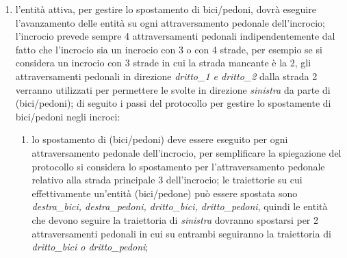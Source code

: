 \begin{enumerate}
\item l'entità attiva, per gestire lo spostamento di bici/pedoni, dovrà eseguire l'avanzamento delle entità su ogni attraversamento pedonale dell'incrocio; l'incrocio prevede sempre 4 attraversamenti pedonali indipendentemente dal fatto che l'incrocio sia un incrocio con 3 o con 4 strade, per esempio se si considera un incrocio con 3 strade in cui la strada mancante è la 2, gli attraversamenti pedonali in direzione \textit{dritto\_1 e dritto\_2} dalla strada 2 verranno utilizzati per permettere le svolte in direzione \textit{sinistra} da parte di (bici/pedoni); di seguito i passi del protocollo per gestire lo spostamente di bici/pedoni negli incroci:
\begin{enumerate}
\item lo spostamento di (bici/pedoni) deve essere eseguito per ogni attraversamento pedonale dell'incrocio, per semplificare la spiegazione del protocollo si considera lo spostamento per l'attraversamento pedonale relativo alla strada principale 3 dell'incrocio; le traiettorie su cui effettivamente un'entità (bici/pedone) può essere spostata sono \textit{des\-tra\_bi\-ci, des\-tra\_pe\-do\-ni, drit\-to\_bi\-ci, drit\-to\_pe\-do\-ni}, quindi le entità che devono seguire la traiettoria di \textit{sinistra} dovranno spostarsi per 2 attraversamenti pedonali in cui su entrambi seguiranno la traiettoria di \textit{drit\-to\_bi\-ci o drit\-to\_pe\-do\-ni};

\end{enumerate}
\end{enumerate}
